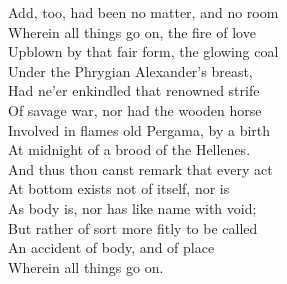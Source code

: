 Add, too, had been no matter, and no room\\
Wherein all things go on, the fire of love\\
Upblown by that fair form, the glowing coal\\
Under the Phrygian Alexander's breast,\\
Had ne'er enkindled that renowned strife\\
Of savage war, nor had the wooden horse\\
Involved in flames old Pergama, by a birth\\
At midnight of a brood of the Hellenes.\\
And thus thou canst remark that every act\\
At bottom exists not of itself, nor is\\
As body is, nor has like name with void;\\
But rather of sort more fitly to be called\\
An accident of body, and of place\\
Wherein all things go on.


